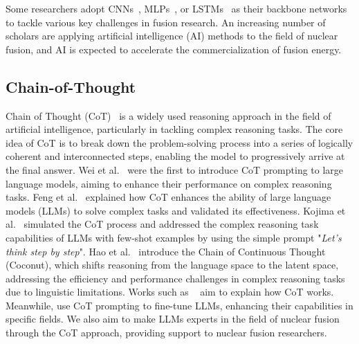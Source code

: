 Some researchers adopt CNNs~\cite{boyer2024cnn_neural, seo2024cnn_avoiding, lin2024cnn_prediction, zanisi2024cnn_efficient, joung2024cnn_mlp_tokamak, bonotto2024cnn_mlp_reconstruction}, MLPs~\cite{sun2024mlp_impact, sanchez2024mlp_real, mehta2024mlp_automated, joung2024cnn_mlp_tokamak, tracey2024mlp_lstm_towards, bonotto2024cnn_mlp_reconstruction}, or LSTMs~\cite{tracey2024mlp_lstm_towards, guo2023lstm_disruption, shin2022lstm_preemptive} as their backbone networks to tackle various key challenges in fusion research. 
An increasing number of scholars are applying artificial intelligence (AI) methods to the field of nuclear fusion, and AI is expected to accelerate the commercialization of fusion energy.



\subsection{Chain-of-Thought}
Chain of Thought (CoT)~\cite{wei2022CoT} is a widely used reasoning approach in the field of artificial intelligence, particularly in tackling complex reasoning tasks. The core idea of CoT is to break down the problem-solving process into a series of logically coherent and interconnected steps, enabling the model to progressively arrive at the final answer. 
Wei et al.~\cite{wei2022CoT} were the first to introduce CoT prompting to large language models, aiming to enhance their performance on complex reasoning tasks. 
Feng et al.~\cite{feng2024towards} explained how CoT enhances the ability of large language models (LLMs) to solve complex tasks and validated its effectiveness. 
Kojima et al.~\cite{kojima2022letsthinkstepbystep} simulated the CoT process and addressed the complex reasoning task capabilities of LLMs with few-shot examples by using the simple prompt "\textit{Let's think step by step}".  
Hao et al.~\cite{hao2024coconut} introduce the Chain of Continuous Thought (Coconut), which shifts reasoning from the language space to the latent space, addressing the efficiency and performance challenges in complex reasoning tasks due to linguistic limitations. 
Works such as ~\cite{chen2023cotexplainyou, madaan2023cotexplainmakes, wang2022cotexplaintowards, wu2023cotexplainanalyzing} aim to explain how CoT works. Meanwhile, \cite{ge2023enhancechain, hu2024enhancechain, cohn2024enhancechain, nong2024enhancechain, li2023enhancestructured} use CoT prompting to fine-tune LLMs, enhancing their capabilities in specific fields. 
We also aim to make LLMs experts in the field of nuclear fusion through the CoT approach, providing support to nuclear fusion researchers.